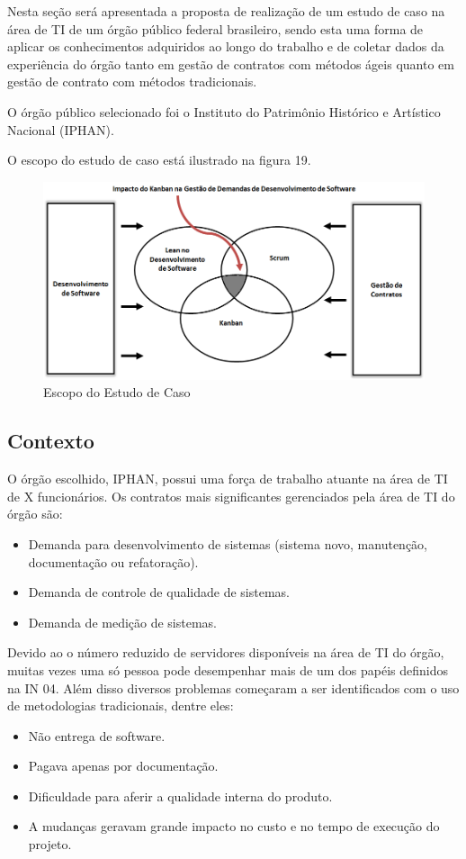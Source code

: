Nesta seção será apresentada a proposta de realização de um estudo de caso na área de TI de um órgão público federal brasileiro, sendo esta uma forma de aplicar os conhecimentos adquiridos ao longo do trabalho e de coletar dados da experiência do órgão tanto em gestão de contratos com métodos ágeis quanto em gestão de contrato com métodos tradicionais.

O órgão público selecionado foi o Instituto do Patrimônio Histórico e Artístico Nacional (IPHAN).

O escopo do estudo de caso está ilustrado na figura 19. 
\begin{figure}[h]
		\centering
		\label{fig01}
			\includegraphics[scale=0.6]{figuras/escopoEC.png}
		\caption{Escopo do Estudo de Caso}
\end{figure}

\subsection[Contexto]{Contexto}

O órgão escolhido, IPHAN, possui uma força de trabalho atuante na área de TI de X funcionários. Os contratos mais significantes gerenciados pela área de TI do órgão são:
\begin{itemize}
\item Demanda para desenvolvimento de sistemas (sistema novo, manutenção, documentação ou refatoração).
\item Demanda de controle de qualidade de sistemas.
\item Demanda de medição de sistemas.
\end{itemize}

Devido ao o número reduzido de servidores disponíveis na área de TI do órgão, muitas vezes uma só pessoa pode desempenhar mais de um dos papéis definidos na IN 04. Além disso diversos problemas começaram a ser identificados com o uso de metodologias tradicionais, dentre eles:
\begin{itemize}
\item Não entrega de software.
\item Pagava apenas por documentação.
\item Dificuldade para aferir a qualidade interna do produto.
\item A mudanças geravam grande impacto no custo e no tempo de execução do projeto.
\end{itemize}

